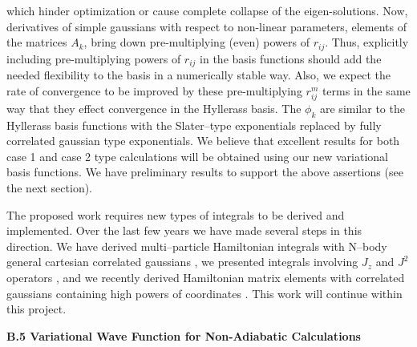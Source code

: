 which hinder optimization or cause complete collapse of the eigen-solutions.
Now, derivatives of simple gaussians with respect to non-linear parameters,
elements of the matrices $A_k$, bring down pre-multiplying (even) powers of $%
r_{ij}$. Thus, explicitly including pre-multiplying powers of $r_{ij}$ in
the basis functions should add the needed flexibility to the basis in a
numerically stable way. Also, we expect the rate of convergence to be
improved by these pre-multiplying $r_{ij}^m$ terms in the same way that they
effect convergence in the Hyllerass basis. The $\phi _k$ are similar to the
Hyllerass basis functions with the Slater--type exponentials replaced by
fully correlated gaussian type exponentials. We believe that excellent
results for both case 1 and case 2 type calculations will be obtained using
our new variational basis functions. We have preliminary results to support
the above assertions (see the next section).

The proposed work requires new types of integrals to be derived
and implemented. Over the last few years we have made several
steps in this direction. We have derived multi--particle
Hamiltonian integrals with N--body 
general cartesian correlated gaussians
\cite{kozlowski92a}, we presented integrals involving
$J_z$ and $J^2$ operators \cite{A20}, and we recently derived
Hamiltonian matrix elements with correlated gaussians
containing high powers of coordinates  \cite{A382}.
This work will continue within this project.

\vspace{2mm}
\noindent
{\bf B.5 Variational Wave Function for Non-Adiabatic Calculations}

